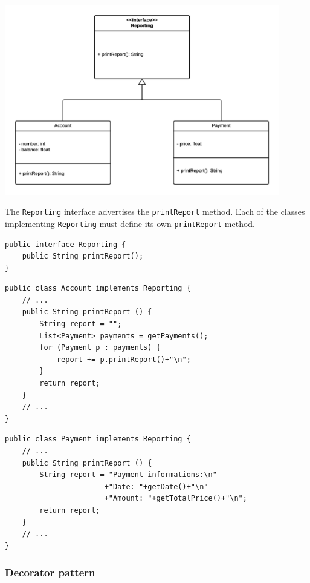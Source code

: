 \documentclass[11pt, a4paper]{article}
\newcommand{\settextlisting}{\lstset{ basicstyle=\small\ttfamily }}
\newcommand{\setcodelisting}{\lstset{ basicstyle=\footnotesize\ttfamily }}
\begin{document}
\centerline{\includegraphics[width=0.9\textwidth]{StrategyPattern.png}}

\medskip
\settextlisting
The \lstinline|Reporting| interface advertises the \lstinline|printReport| method.
Each of the classes implementing \lstinline|Reporting| must define its own \lstinline|printReport| method.

\bigskip
\lstset{ basicstyle=\scriptsize\ttfamily }
\begin{lstlisting}
public interface Reporting {
	public String printReport();
}
\end{lstlisting}


\begin{lstlisting}
public class Account implements Reporting {
	// ...
	public String printReport () {
		String report = "";
		List<Payment> payments = getPayments();
		for (Payment p : payments) {
			report += p.printReport()+"\n";
		}
		return report;
	}
	// ...
}
\end{lstlisting}


\begin{lstlisting}
public class Payment implements Reporting {
	// ...
	public String printReport () {
		String report = "Payment informations:\n"
					   +"Date: "+getDate()+"\n"
					   +"Amount: "+getTotalPrice()+"\n";
		return report;
	}
	// ...
}

\end{lstlisting}




\subsubsection{Decorator pattern}
\end{document}
